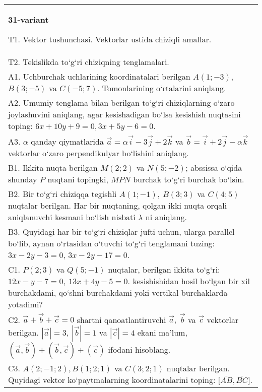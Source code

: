 \documentclass{article}
\begin{document}
\begin{tabular}{m{17cm}}
\textbf{31-variant}

T1. 
Vektor tushunchasi. Vektorlar ustida chiziqli amallar.
 \\
T2. 
Tekislikda to‘g‘ri chiziqning tenglamalari.
 \\
A1. 
Uchburchak uchlarining koordinatalari berilgan
$A (1;-3) $, $B (3;-5) $ va $C (-5;7) $. Tomonlarining o‘rtalarini
aniqlang.
 \\
A2. 
Umumiy tenglama bilan berilgan to‘g‘ri chiziqlarning
o‘zaro joylashuvini aniqlang, agar kesishadigan bo‘lsa kesishish nuqtasini
toping: $6x+10y+9=0, 3x+5y-6=0$.
 \\
A3. 
$\alpha$
qanday qiymatlarida 
$\overrightarrow{a} = \alpha\overrightarrow{i} - 3\overrightarrow{j} + 2\overrightarrow{k}$
va
$\overrightarrow{b} = \overrightarrow{i} + 2\overrightarrow{j} - \alpha\overrightarrow{k}$
vektorlar o‘zaro perpendikulyar bo‘lishini aniqlang.
 \\
B1. 
Ikkita nuqta berilgan \(M (2;2) \) va \(N (5;-2) \); abssissa o‘qida shunday $P$ nuqtani topingki, $MPN$ burchak to‘g‘ri burchak bo‘lsin.
 \\
B2. 
Bir to‘g‘ri chiziqqa tegishli \(A (1;-1),\ B (3;3) \) va
\(C (4;5) \) nuqtalar berilgan. Har bir nuqtaning, qolgan ikki nuqta orqali aniqlanuvchi kesmani bo‘lish nisbati $\lambda$ ni aniqlang.
 \\
B3. 
Quyidagi har bir to‘g‘ri chiziqlar jufti uchun, ularga parallel
bo‘lib, aynan o‘rtasidan o‘tuvchi to‘g‘ri tenglamani tuzing: $3x-2y-3=0$, $3x-2y-17=0$.
 \\
C1. 
\(P (2;3) \) va \(Q (5;-1) \) nuqtalar, berilgan ikkita
to‘g‘ri: $12x-y-7=0,\ 13x+4y-5=0$.
kesishishidan hosil bo‘lgan bir xil burchakdami, qo‘shni burchakdami yoki vertikal
burchaklarda yotadimi?
 \\
C2. 
$\vec{a} + \vec{b} + \vec{c} = 0$ shartni qanoatlantiruvchi $\vec{a},\ \vec{b}$ va $\vec{c}$ vektorlar berilgan. $|\vec{a}| = 3,\ |\vec{b}| = 1$ va $|\vec{c}| = 4$ ekani ma’lum, $\left(\vec{a},\vec{b} \right) + \left(\vec{b},\vec{c} \right) + (\vec{c}) $ ifodani hisoblang.
 \\
C3. 
$A (2; -1;2),B (1;2; 1) $ va $C (3;2;1)$ nuqtalar berilgan. Quyidagi vektor ko‘paytmalarning koordinatalarini toping:
$\lbrack\overline{AB},\overline{BC}\rbrack$.
 \\

\end{tabular}
\vspace{1cm}
\end{document}
